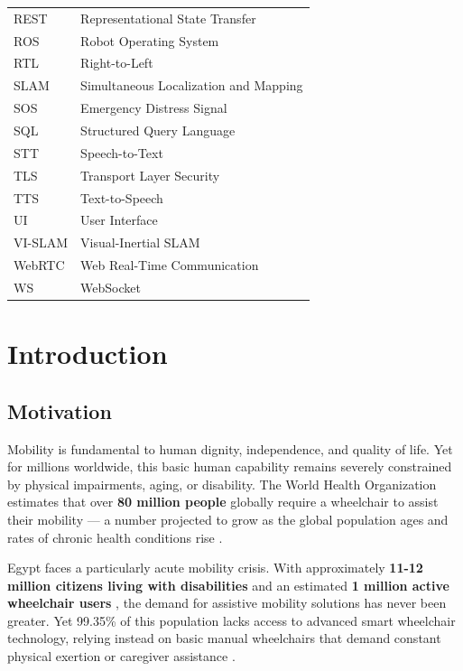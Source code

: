 \documentclass[12pt,a4paper]{report}
\begin{document}
\begin{center}
\begin{longtable}{@{}lp{}@{}}
REST    & Representational State Transfer \\
ROS     & Robot Operating System \\
RTL     & Right-to-Left \\
SLAM    & Simultaneous Localization and Mapping \\
SOS     & Emergency Distress Signal \\
SQL     & Structured Query Language \\
STT     & Speech-to-Text \\
TLS     & Transport Layer Security \\
TTS     & Text-to-Speech \\
UI      & User Interface \\
VI-SLAM & Visual-Inertial SLAM \\
WebRTC  & Web Real-Time Communication \\
WS      & WebSocket \\
\end{longtable}
\end{center}%
\chapter{Introduction}

\section{Motivation}

Mobility is fundamental to human dignity, independence, and quality of life. Yet for
millions worldwide, this basic human capability remains severely constrained by physical
impairments, aging, or disability. The World Health Organization estimates that over
\textbf{80 million people} globally require a wheelchair to assist their mobility --- a number
projected to grow as the global population ages and rates of chronic health conditions
rise \cite{who_wheelchair_guidelines}.

Egypt faces a particularly acute mobility crisis. With approximately
\textbf{11-12 million citizens living with disabilities} and an estimated
\textbf{1 million active wheelchair users} \cite{idsc_egypt}, the demand for assistive
mobility solutions has never been greater. Yet 99.35\% of this population lacks access to
advanced smart wheelchair technology, relying instead on basic manual wheelchairs that
demand constant physical exertion or caregiver assistance \cite{alhassan_foundation}.
\end{document}
